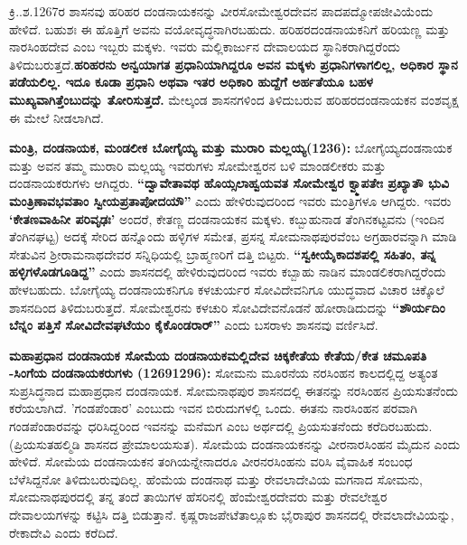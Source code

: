 ಕ್ರಿ..ಶ.1267ರ ಶಾಸನವು ಹರಿಹರ ದಂಡನಾಯಕನನ್ನು ವೀರಸೋಮೇಶ್ವರದೇವನ ಪಾದಪದ್ಮೋಪಜೀವಿಯೆಂದು ಹೇಳಿದೆ. ಬಹುಶಃ ಈ ಹೊತ್ತಿಗೆ ಅವನು ವಯೋವೃದ್ಧನಾಗಿರಬಹುದು. ಹರಿಹರದಂಡನಾಯಕನಿಗೆ ಹರಿಯಣ್ಣ ಮತ್ತು ನಾರಸಿಂಹದೇವ ಎಂಬ ಇಬ್ಬರು ಮಕ್ಕಳು. ಇವರು ಮಲ್ಲಿಕಾರ್ಜುನ ದೇವಾಲಯದ ಸ್ಥಾನಿಕರಾಗಿದ್ದರೆಂದು ತಿಳಿದುಬರುತ್ತದೆ.\break \textbf{ಹರಿಹರನು ಅನ್ವಯಾಗತ ಪ್ರಧಾನಿಯಾಗಿದ್ದರೂ ಅವನ ಮಕ್ಕಳು ಪ್ರಧಾನಿಗಳಾಗಲಿಲ್ಲ, ಅಧಿಕಾರ ಸ್ಥಾನ ಪಡೆಯಲಿಲ್ಲ. ಇದೂ ಕೂಡಾ ಪ್ರಧಾನಿ ಅಥವಾ ಇತರ ಅಧಿಕಾರಿ ಹುದ್ದೆಗೆ ಅರ್ಹತೆಯೂ ಬಹಳ ಮುಖ್ಯವಾಗಿತ್ತೆಂಬುದನ್ನು ತೋರಿಸುತ್ತದೆ. }ಮೇಲ್ಕಂಡ ಶಾಸನಗಳಿಂದ ತಿಳಿದುಬರುವ ಹರಿಹರದಂಡನಾಯಕನ ವಂಶವೃಕ್ಷ ಈ ಮೇಲೆ ನೀಡಲಾಗಿದೆ.

\textbf{ಮಂತ್ರಿ, ದಂಡನಾಯಕ, ಮಂಡಲೀಕ ಬೋಗೈಯ್ಯ ಮತ್ತು ಮುರಾರಿ ಮಲ್ಲಯ್ಯ(1236):} ಬೋಗೈಯ್ಯ\break ದಂಡನಾಯಕ ಮತ್ತು ಅವನ ತಮ್ಮ ಮುರಾರಿ ಮಲ್ಲಯ್ಯ ಇವರುಗಳು ಸೋಮೇಶ್ವರನ ಬಳಿ ಮಾಂಡಲೀಕರು ಮತ್ತು ದಂಡನಾಯಕರುಗಳು ಆಗಿದ್ದರು.\textbf{ “ದ್ವಾವೇತಾವಥ ಹೊಯ್ಸಲಾಹ್ವಯವತ ಸೋಮೇಶ್ವರ ಕ್ವ್ಮಾಪತೇಃ ಪ್ರಖ್ಯಾತೌ ಭುವಿ ಮಂತ್ರಿಣಾವಭವತಾಂ ಸ್ವೀಯಪ್ರತಾಪೋದಯೌ”} ಎಂದು ಹೇಳಿರುವುದರಿಂದ ಇವರು ಮಂತ್ರಿಗಳೂ ಆಗಿದ್ದರು. ಇವರು \textbf{‘ಕೇತಣವಾಹಿನೀ ಪರಿವೃಢಃ’} ಅಂದರೆ, ಕೇತಣ್ಣ ದಂಡನಾಯಕನ ಮಕ್ಕಳು. ಕಬ್ಬುಹುನಾಡ ತೆಂಗಿನಕಟ್ಟವನು (ಇಂದಿನ ತೆಂಗಿನಘಟ್ಟ) ಅದಕ್ಕೆ ಸೇರಿದ ಹನ್ನೊಂದು ಹಳ್ಳಿಗಳ ಸಮೇತ, ಪ್ರಸನ್ನ ಸೋಮನಾಥಪುರವೆಂಬ ಅಗ್ರಹಾರವನ್ನಾಗಿ ಮಾಡಿ ಸೇತುವಿನ ಶ‍್ರೀರಾಮನಾಥದೇವರ ಸನ್ನಿಧಿಯಲ್ಲಿ ಬ್ರಾಹ್ಮಣರಿಗೆ ದತ್ತಿ ಬಿಟ್ಟರು. \textbf{“ಸ್ವಕೀಯೈಕಾದಶಪಲ್ಲಿ ಸಹಿತಂ, ತನ್ನ ಹಳ್ಳಿಗಳೊಡಗೂಡಿದ್ದ”} ಎಂದು ಶಾಸನದಲ್ಲಿ ಹೇಳಿರುವುದರಿಂದ ಇವರು ಕಬ್ಬಾಹು ನಾಡಿನ ಮಾಂಡಲಿಕರಾಗಿದ್ದರೆಂದು ಹೇಳ\-ಬಹುದು. ಬೋಗೈಯ್ಯ ದಂಡನಾಯಕನಿಗೂ ಕಳಚುರ್ಯರ ಸೋವಿದೇವನಿಗೂ ಯುದ್ಧವಾದ ವಿಚಾರ ಚಿಕ್ಕೊಲೆ ಶಾಸನದಿಂದ ತಿಳಿದು\-ಬರುತ್ತದೆ. ಸೋಮೇಶ್ವರನು ಕಳಚುರಿ ಸೋವಿದೇವನೊಡನೆ ಹೋರಾಡಿದುದನ್ನು \textbf{“ಶೌರ್ಯದಿಂ ಬೆನ್ನಂ ಪತ್ತಿಸೆ ಸೋವಿದೇವಘಟೆಯಂ ಕೈಕೊಂಡರಾರ್​”} ಎಂದು ಬಸರಾಳು ಶಾಸನವು ವರ್ಣಿಸಿದೆ.

\textbf{ಮಹಾಪ್ರಧಾನ ದಂಡನಾಯಕ ಸೋಮೆಯ ದಂಡನಾಯಕ\general{\enginline{-}}ಮಲ್ಲಿದೇವ  ಚಿಕ್ಕಕೇತೆಯ \general{\enginline{-}}ಕೇತೆಯ/ಕೇತ ಚಮೂಪತಿ -ಸಿಂಗೆಯ ದಂಡನಾಯಕರುಗಳು (1269\general{\enginline{-}}1296):} ಸೋಮನು ಮೂರನೆಯ ನರಸಿಂಹನ ಕಾಲದಲ್ಲಿದ್ದ ಅತ್ಯಂತ ಸುಪ್ರಸಿದ್ಧನಾದ ಮಹಾಪ್ರಧಾನ ದಂಡನಾಯಕ. ಸೋಮನಾಥಪುರ ಶಾಸನದಲ್ಲಿ ಈತನನ್ನು ನರಸಿಂಹನ ಪ್ರಿಯಸುತನೆಂದು ಕರೆಯಲಾಗಿದೆ. 'ಗಂಡಪೆಂಡಾರ' ಎಂಬುದು ಇವನ ಬಿರುದುಗಳಲ್ಲಿ ಒಂದು. ಈತನು ನಾರಸಿಂಹನ ಪರವಾಗಿ ಗಂಡಪೆಂಡಾರವನ್ನು ಧರಿಸಿದ್ದರಿಂದ ಇವನನ್ನು ಮನೆಮಗ ಎಂಬ ಅರ್ಥದಲ್ಲಿ ಪ್ರಿಯಸುತನೆಂದು ಕರೆದಿರಬಹುದು. (ಪ್ರಿಯಸುತ\enginline{-}ಹಲ್ಮಿಡಿ ಶಾಸನದ ಪ್ರೇಮಾಲಯಸುತ). ಸೋಮೆಯ ದಂಡನಾಯಕನನ್ನು ವೀರನಾರಸಿಂಹನ ಮೈದುನ ಎಂದು ಹೇಳಿದೆ. ಸೋಮೆಯ ದಂಡನಾಯಕನ ತಂಗಿಯನ್ನೇನಾ\-ದರೂ ವೀರನರಸಿಂಹನು ವರಿಸಿ ವೈವಾಹಿಕ ಸಂಬಂಧ ಬೆಳೆಸಿದ್ದನೋ ತಿಳಿದುಬರುವುದಿಲ್ಲ. ಹೆಂಮೆಯ ದಂಡನಾಥ ಮತ್ತು ರೇವಲಾದೇವಿಯ ಮಗನಾದ ಸೋಮನು, ಸೋಮನಾಥಪುರದಲ್ಲಿ ತನ್ನ ತಂದೆ ತಾಯಿಗಳ ಹೆಸರಿನಲ್ಲಿ ಹೆಂಮೇಶ್ವರದೇವರು ಮತ್ತು ರೇವಲೇಶ್ವರ ದೇವಾಲಯಗಳನ್ನು ಕಟ್ಟಿಸಿ ದತ್ತಿ ಬಿಡುತ್ತಾನೆ. ಕೃಷ್ಣರಾಜಪೇಟೆ\break ತಾಲ್ಲೂಕು ಭೈರಾಪುರ ಶಾಸನದಲ್ಲಿ ರೇವಲಾದೇವಿಯನ್ನು, ರೇಕಾದೇವಿ ಎಂದು ಕರೆದಿದೆ.

